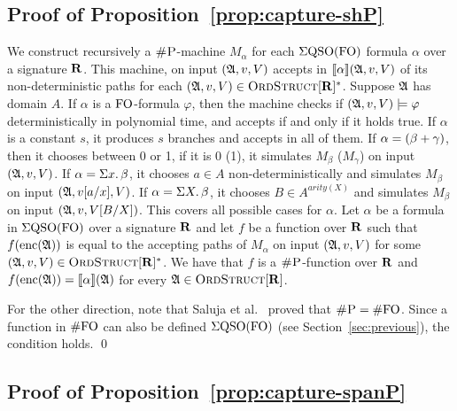 
\medskip

\subsection*{Proof of Proposition~\ref{prop:capture-shP}}

We construct recursively a $\text{\sc \#P}$-machine $M_{\alpha}$ for each $\Sigma{\rm QSO}({\rm FO})$ formula $\alpha$ over a signature $\mathbf{R}$. This machine, on input $(\mathfrak{A},v,V)$ accepts in ${\llbracket{}{\alpha}\rrbracket}(\mathfrak{A},v,V)$ of its non-deterministic paths for each $(\mathfrak{A},v,V) \in \text{\sc OrdStruct}[\mathbf{R}]^*$. Suppose $\mathfrak{A}$ has domain $A$. If $\alpha$ is a ${\rm FO}$-formula $\varphi$, then the machine checks if $(\mathfrak{A},v,V)\models\varphi$ deterministically in polynomial time, and accepts if and only if it holds true. If $\alpha$ is a constant $s$, it produces $s$ branches and accepts in all of them. If $\alpha = (\beta + \gamma)$, then it chooses between 0 or 1, if it is 0 (1), it simulates $M_{\beta}$ ($M_{\gamma}$) on input $(\mathfrak{A},v,V)$. 
If $\alpha = \Sigma{x}.\,\beta$, it chooses $a\in A$ non-deterministically and simulates $M_{\beta}$ on input $(\mathfrak{A},v[a/x],V)$.
If $\alpha = \Sigma{X}.\,\beta$, it chooses $B\in A^{arity(X)}$ and simulates $M_{\beta}$ on input $(\mathfrak{A},v,V[B/X])$. This covers all possible cases for $\alpha$. Let $\alpha$ be a formula in $\Sigma{\rm QSO}({\rm FO})$ over a signature $\mathbf{R}$ and let $f$ be a function over $\mathbf{R}$ such that $f({\rm enc}(\mathfrak{A}))$ is equal to the accepting paths of $M_{\alpha}$ on input $(\mathfrak{A},v,V)$ for some $(\mathfrak{A},v,V) \in \text{\sc OrdStruct}[\mathbf{R}]^*$. We have that $f$ is a $\text{\sc \#P}$-function over $\mathbf{R}$ and $f({\rm enc}(\mathfrak{A})) = {\llbracket{}{\alpha}\rrbracket}(\mathfrak{A})$ for every $\mathfrak{A}\in\text{\sc OrdStruct}[\mathbf{R}]$.

For the other direction, note that Saluja et al.~\cite{SalujaST95} proved that $\text{\sc \#P} = \#{\rm FO}$. 
Since a function in $\#{\rm FO}$ can also be defined $\Sigma{\rm QSO}({\rm FO})$ (see Section~\ref{sec:previous}), the condition holds. \qed

\medskip

\subsection*{Proof of Proposition~\ref{prop:capture-spanP}}

